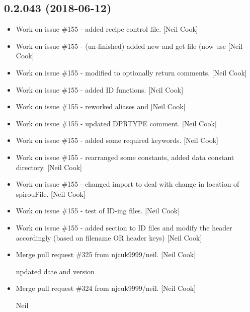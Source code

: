 \documentclass[a4paper,10pt,english]{report}
\begin{document}
\subsection{0.2.043 (2018-06-12)}
\label{\detokenize{misc/changelog:id422}}\begin{itemize}
\item {} 
Work on issue \#155 - added recipe control file. {[}Neil Cook{]}

\item {} 
Work on issue \#155 - (un-finished) added new  and
get file (now use  {[}Neil Cook{]}

\item {} 
Work on issue \#155 - modified  to optionally return
comments. {[}Neil Cook{]}

\item {} 
Work on issue \#155 - added ID functions. {[}Neil Cook{]}

\item {} 
Work on issue \#155 - reworked aliases and  {[}Neil Cook{]}

\item {} 
Work on issue \#155 - updated DPRTYPE comment. {[}Neil Cook{]}

\item {} 
Work on issue \#155 - added some required keywords. {[}Neil Cook{]}

\item {} 
Work on issue \#155 - rearranged some constants, added data constant
directory. {[}Neil Cook{]}

\item {} 
Work on issue \#155 - changed import to deal with change in location of
spirouFile. {[}Neil Cook{]}

\item {} 
Work on issue \#155 - test of ID-ing files. {[}Neil Cook{]}

\item {} 
Work on issue \#155 - added section to ID files and modify the header
accordingly (based on filename OR header keys) {[}Neil Cook{]}

\item {} 
Merge pull request \#325 from njcuk9999/neil. {[}Neil Cook{]}

updated date and version

\item {} 
Merge pull request \#324 from njcuk9999/neil. {[}Neil Cook{]}

Neil

\end{itemize}
\end{document}
